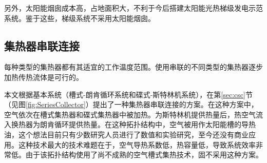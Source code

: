 另外，太阳能烟囱成本高，占地面积大，不利于今后搭建太阳能光热梯级发电示范系统。鉴于这些，梯级系统不采用太阳能烟囱。

\subsection{集热器串联连接}
\label{sec:seriesConnection}
每种类型的集热器都有其适宜的工作温度范围。使用串联的不同类型的集热器逐步加热传热流体是可行的。

本文根据基本系统（槽式-朗肯循环系统和碟式-斯特林机系统），在第\ref{sec:csc}节（见图\ref{fig:SeriesCollector}）提出了一种集热器串联连接的方案。在这种方案中，空气依次在槽式集热器和碟式集热器中被加热。为斯特林机提供热量后，热空气流入换热器为朗肯循环提供热量。在这种拓扑结构中，空气被用作太阳能槽的导热油，这个想法目前只有少数研究人员进行了数值和实验研究，至今还没有商业应用\cite{Good2015,Good2016}。这种技术最大的技术难题在于，空气导热系数低，热容量低，导致系统效率非常低。由于该拓扑结构使用了尚不成熟的空气槽式集热技术，固不采用这种方案。

